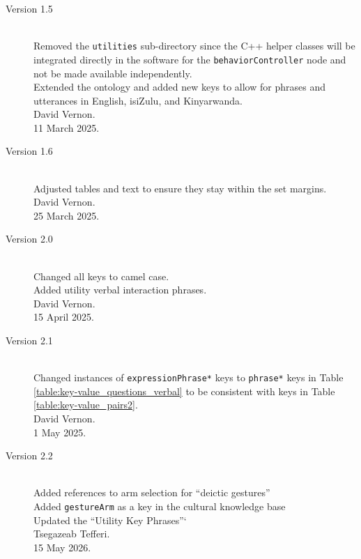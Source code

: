 \documentclass{CSSRforAfrica}
\begin{document}
\begin{description}
\item [Version 1.5]~\\
Removed  the {\small \tt utilities} sub-directory since the C++ helper classes will be integrated directly in the software for the {\small \tt behaviorController} node and not be made available independently.\\
Extended the ontology and added new keys to allow for phrases and utterances in English, isiZulu, and Kinyarwanda.\\
David Vernon.\\
11 March 2025.   \\   

\item [Version 1.6]~\\
Adjusted tables and text to ensure they stay within the set margins.\\
David Vernon.\\
25 March 2025.   \\  

\item [Version 2.0]~\\
Changed all keys to camel case.\\
Added utility verbal interaction phrases.\\
David Vernon.\\
15 April 2025.   \\  

\item [Version 2.1]~\\
Changed instances of {\small \tt expressionPhrase*} keys to {\small \tt phrase*} keys in Table \ref{table:key-value_questions_verbal} to be consistent with keys in Table \ref{table:key-value_pairs2}.\\
David Vernon.\\
1 May 2025.   \\  


\item [Version 2.2]~\\
Added references to arm selection for ``deictic gestures'' \\
Added {\small \tt gestureArm} as a key in the cultural knowledge base \\
Updated the ``Utility Key Phrases''` \\
Tsegazeab Tefferi.\\
15 May 2026.   \\  

\end{description}
\end{document}
